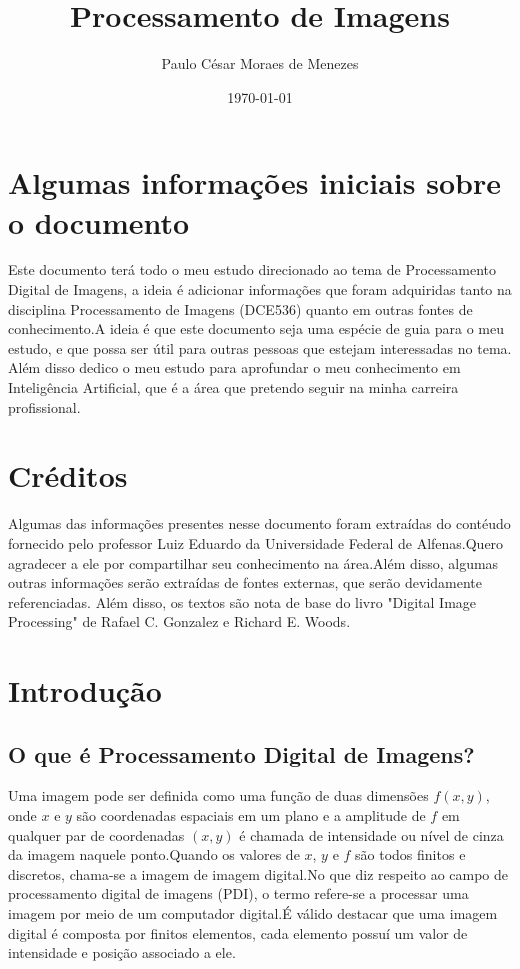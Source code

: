 \documentclass[12pt]{article}
\title{Processamento de Imagens}
\author{Paulo César Moraes de Menezes}
\date{\today}
\begin{document}
\maketitle

\newpage

\tableofcontents %

\newpage

\section{Algumas informações iniciais sobre o documento}

Este documento terá todo o meu estudo direcionado ao tema de Processamento Digital de Imagens, a ideia é adicionar informações que foram
adquiridas tanto na disciplina Processamento de Imagens (DCE536) quanto em outras fontes de conhecimento.A ideia é que este documento seja
uma espécie de guia para o meu estudo, e que possa ser útil para outras pessoas que estejam interessadas no tema.
Além disso dedico o meu estudo para aprofundar o meu conhecimento em Inteligência Artificial, que é a área que pretendo seguir na minha
carreira profissional.

\section{Créditos}

Algumas das informações presentes nesse documento foram extraídas do contéudo fornecido pelo professor Luiz Eduardo da Universidade Federal de
Alfenas.Quero agradecer a ele por compartilhar seu conhecimento na área.Além disso, algumas outras informações serão extraídas de fontes
externas, que serão devidamente referenciadas. Além disso, os textos são nota de base do livro "Digital Image Processing" de Rafael C. Gonzalez e Richard E. Woods.


\section{Introdução}



\subsection{O que é Processamento Digital de Imagens?}

Uma imagem pode ser definida como uma função de duas dimensões $f(x,y)$, onde $x$ e $y$ são coordenadas
espaciais em um plano e a amplitude de $f$ em qualquer par de coordenadas $(x,y)$ é chamada de intensidade
ou nível de cinza da imagem naquele ponto.Quando os valores de $x$, $y$ e $f$ são todos finitos e
discretos, chama-se a imagem de imagem digital.No que diz respeito ao campo de processamento digital
de imagens (PDI), o termo refere-se a processar uma imagem por meio de um computador digital.É válido
destacar que uma imagem digital é composta por finitos elementos, cada elemento possuí um valor de
intensidade e posição associado a ele.
\end{document}
